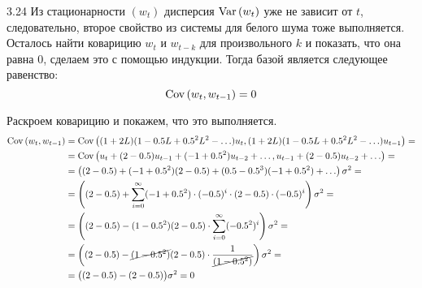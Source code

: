 \begin{solution}{{3.24}}
Из стационарности $(w_t)$ дисперсия $\operatorname{Var}{\left(w_t\right)}$ уже не зависит от $t$, следовательно, второе свойство из системы для белого шума тоже выполняется. Осталось найти коварицию $w_t$ и $w_{t-k}$ для произвольного $k$ и показать, что она равна 0, сделаем это с помощью индукции. Тогда базой является следующее равенство:
\[
    \operatorname{Cov}{\left(w_t, w_{t-1}\right)} = 0
\]

Раскроем коварицию и покажем, что это выполняется.
\begin{align*}
    \operatorname{Cov}{\left(w_t, w_{t-1}\right)} &= \operatorname{Cov}{\left((1 + 2L) (1 - 0.5L + 0.5^2 L^2 - \ldots)u_t, (1 + 2L) (1 - 0.5L + 0.5^2 L^2 - \ldots)u_{t-1}\right)} = \\
    &= \operatorname{Cov}{\left(u_t + (2 - 0.5)u_{t-1} + (-1 +0.5^2)u_{t-2} + \ldots, u_{t-1} + (2 - 0.5)u_{t-2} + \ldots\right)} = \\
    &= \left((2 - 0.5) + (-1 + 0.5^2)(2 - 0.5) + (0.5 - 0.5^3)(-1 + 0.5^2) + \ldots\right) \sigma^2 = \\
    &= \left((2 - 0.5) + \sum_{i = 0}^{\infty}(-1 + 0.5^2)\cdot (-0.5)^i \cdot (2 - 0.5) \cdot (-0.5)^i\right) \sigma^2 = \\
    &= \left((2 - 0.5) - (1 - 0.5^2)(2 - 0.5)\cdot \sum_{i = 0}^{\infty}(-0.5^2)^i\right) \sigma^2 = \\
    &= \left((2 - 0.5) - \cancel{(1 - 0.5^2)}(2 - 0.5)\cdot \frac{1}{\cancel{(1 - 0.5^2)}}\right) \sigma^2 = \\
    &= \big((2 - 0.5) - (2 - 0.5)\big) \sigma^2 = 0 \\
\end{align*}


\end{solution}

